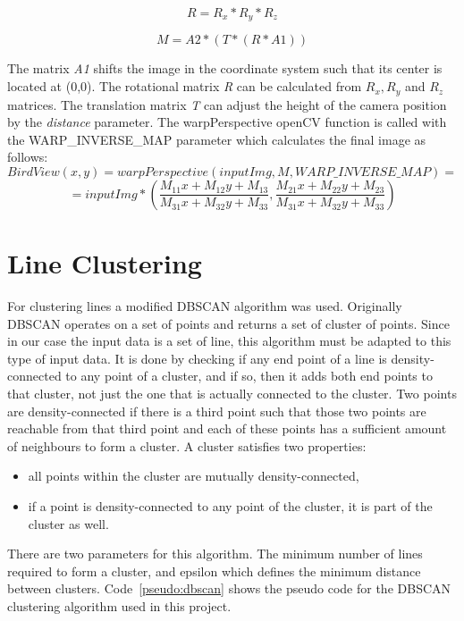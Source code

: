 \documentclass[Report.tex]{subfiles}
\begin{document}
\[
R=R_{x}*R_{y}*R_{z}
\]

\[
M = A2*(T*(R*A1))
\]
\Large

The matrix \textit{A1} shifts the image in the coordinate system such that its center is located at (0,0).
The rotational matrix \textit{R} can be calculated from \textit{$R_{x}, R_{y}$}
and \textit{$R_{z}$} matrices.  The translation matrix \textit{T} can adjust
the height of the camera position by the \textit{distance} parameter. The
warpPerspective openCV function is called with the WARP\_INVERSE\_MAP parameter
which calculates the final image as follows:
\normalsize
\[BirdView(x,y)= warpPerspective(inputImg, M, WARP\_INVERSE\_MAP) = \]
\[= inputImg*(\frac{M_{11}x+M_{12}y+M_{13}}{M_{31}x+M_{32}y+M_{33}},\frac{M_{21}x+M_{22}y+M_{23}}{M_{31}x+M_{32}y+M_{33}})\]
\Large

\section{Line Clustering} %
\label{sec:Line Clustering}
For clustering lines a modified DBSCAN\cite{www:dbscan} algorithm was used. Originally
DBSCAN operates on a set of points and returns a set of cluster of points.
Since in our case the input data is a set of line, this algorithm must be
adapted to this type of input data. It is done by checking if any end point of
a line is density-connected to any point of a cluster, and if so, then it adds both end
points to that cluster, not just the one that is actually connected to the
cluster.  Two points are density-connected if there is a third point such that
those two points are reachable from that third point and each of these points
has a sufficient amount of neighbours to form a cluster.
A cluster satisfies two properties:
\begin{itemize}
  \item all points within the cluster are mutually density-connected,
  \item if a point is density-connected to any point of the cluster, it is part
of the cluster as well.
\end{itemize}
There are two parameters for this algorithm. The minimum number of lines
required to form a cluster, and epsilon which defines the minimum distance
between clusters.
Code~\ref{pseudo:dbscan} shows the pseudo code for the DBSCAN clustering
algorithm used in this project.
\end{document}

